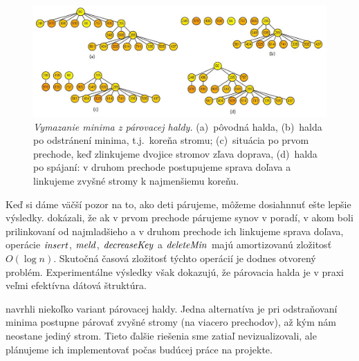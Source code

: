 \begin{figure}
\centering
\includegraphics[width=2\columnwidth]{obrazky/pairdel.png}
\caption{\emph{Vymazanie minima z párovacej haldy.} 
(a)~pôvodná halda, (b)~halda po odstránení minima, t.j.\ koreňa stromu; (c)~situácia po prvom
prechode, keď zlinkujeme dvojice stromov zľava doprava, (d)~halda po spájaní: v druhom
prechode postupujeme sprava doľava a linkujeme zvyšné stromy k najmenšiemu koreňu.} 
\label{img:pairdel} 
\end{figure}

Keď si dáme väčší pozor na to, ako deti párujeme, môžeme dosiahnnuť ešte lepšie 
výsledky. \citet{pairing} dokázali, že ak v prvom prechode párujeme synov v poradí,
v akom boli prilinkovaní od najmladšieho a v druhom prechode ich linkujeme sprava doľava,
operácie $\mathop{\mathit{insert}}$, $\mathop{\mathit{meld}}$, $\mathop{\mathit{decreaseKey}}$ a $\mathop{\mathit{deleteMin}}$ majú amortizovanú zložitosť $O(\log n)$.
Skutočná časová zložitosť týchto operácií je dodnes otvorený problém. 
Experimentálne výsledky \citep{moret91,pettie02} však dokazujú, že párovacia halda
je v praxi veľmi efektívna dátová štruktúra.

\citet{pairing} navrhli niekoľko variant párovacej haldy. Jedna alternatíva je pri odstraňovaní minima
postupne párovať zvyšné stromy (na viacero prechodov), až kým nám neostane jediný strom.
Tieto ďalšie riešenia sme zatiaľ nevizualizovali, ale plánujeme ich implementovať počas budúcej práce na projekte.



